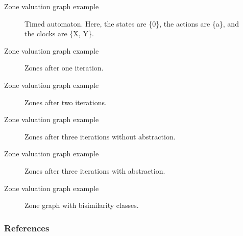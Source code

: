 \documentclass{beamer}
\begin{document}
\begin{frame}{Zone valuation graph example}
  \begin{figure}
    \centering
    \def\svgwidth{0.6\columnwidth}
    
    \caption{Timed automaton. Here, the states are \{0\}, the actions
      are \{a\}, and the clocks are \{X, Y\}.}
  \end{figure}
\end{frame}

\begin{frame}{Zone valuation graph example}
  \begin{figure}
    \centering
    \def\svgwidth{0.4\columnwidth}
    
    \caption{Zones after one iteration.}
  \end{figure}
\end{frame}

\begin{frame}[shrink=20]{Zone valuation graph example}
  \begin{figure}
    \centering
    \def\svgwidth{0.7\columnwidth}
    
    \caption{Zones after two iterations.}
  \end{figure}
\end{frame}

\begin{frame}[shrink=20]{Zone valuation graph example}
  \begin{figure}
    \centering
    \def\svgwidth{0.9\columnwidth}
    
    \caption{Zones after three iterations without abstraction.}
  \end{figure}
\end{frame}

\begin{frame}[shrink=20]{Zone valuation graph example}
  \begin{figure}
    \centering
    \def\svgwidth{1.2\columnwidth}
    
    \caption{Zones after three iterations with abstraction.}
  \end{figure}
\end{frame}

\begin{frame}[shrink=60]{Zone valuation graph example}
  \begin{figure}
    \centering
    \def\svgwidth{2.7\columnwidth}
    
    \caption{Zone graph with bisimilarity classes.}
  \end{figure}
\end{frame}

\begin{frame}[allowframebreaks,shrink=20]
  \frametitle{References}
  
  
\end{frame}
\end{document}
